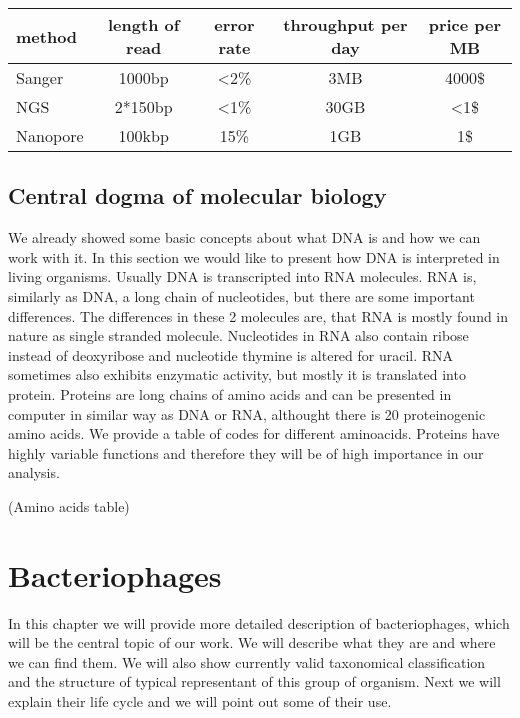 \begin{center}
  \begin{tabular}{ | l | c | c | c | c | }
    \hline
    method & length of read & error rate & throughput per day & price per MB \\
    \hline
    Sanger & 1000bp & <2\% & 3MB & 4000\$ \\
    NGS & 2*150bp & <1\% & 30GB & <1\$ \\
    Nanopore & 100kbp & 15\% & 1GB & 1\$ \\
    \hline
  \end{tabular}
\end{center}

\section{Central dogma of molecular biology}
We already showed some basic concepts about what DNA is and how we can work with it.
In this section we would like to present how DNA is interpreted in living organisms.
Usually DNA is transcripted into RNA molecules.
RNA is, similarly as DNA, a long chain of nucleotides, but there are some important differences.
The differences in these 2 molecules are, that RNA is mostly found in nature as single stranded molecule.
Nucleotides in RNA also contain ribose instead of deoxyribose and nucleotide thymine is altered for uracil.
RNA sometimes also exhibits enzymatic activity, but mostly it is translated into protein.
Proteins are long chains of amino acids and can be presented in computer in similar way as DNA or RNA, althought there is 20 proteinogenic amino acids.
We provide a table of codes for different aminoacids.
Proteins have highly variable functions and therefore they will be of high importance in our analysis.

\medskip
(Amino acids table)
\medskip

\chapter{Bacteriophages}
In this chapter we will provide more detailed description of bacteriophages, which will be the central topic of our work.
We will describe what they are and where we can find them.
We will also show currently valid taxonomical classification and the structure of typical representant of this group of organism.
Next we will explain their life cycle and we will point out some of their use.

